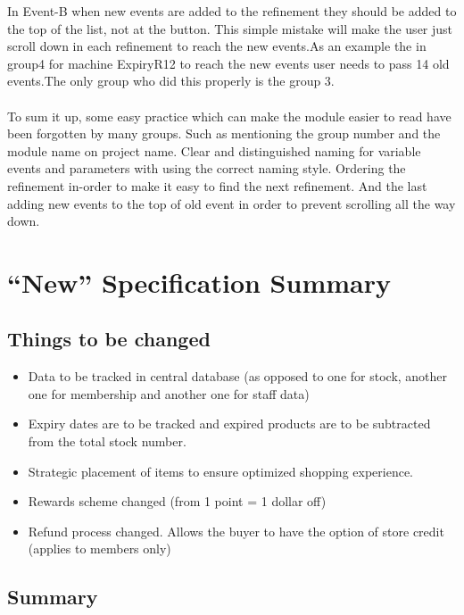 In Event-B when new events are added to the refinement they should be added to the top of the list, not at the button. This simple mistake will make the user just scroll down in each refinement to reach the new events.As an example the in group4 for machine ExpiryR12 to reach the new events user needs to pass 14 old events.The only group who did this properly is the group 3.  \\ \\  To sum it up, some easy practice which can make the module easier to read have been forgotten by many groups. Such as mentioning the group number and the module name on project name. Clear and distinguished naming for variable events and parameters with using the correct naming style. Ordering the refinement in-order to make it easy to find the next refinement. And the last adding new events to the top of old event in order to prevent scrolling all the way down.

\chapter{``New'' Specification Summary}
\label{newspecificationsummary}

\section{Things to be changed}
\label{thingstobechanged}

\begin{itemize}
\item Data to be tracked in central database (as opposed to one for stock, another one for membership and another one for staff data)

\item Expiry dates are to be tracked and expired products are to be subtracted from the total stock number.

\item Strategic placement of items to ensure optimized shopping experience.

\item Rewards scheme changed (from 1 point = 1 dollar off)

\item Refund process changed. Allows the buyer to have the option of store credit (applies to members only)

\end{itemize}

\section{Summary}
\label{summary}


